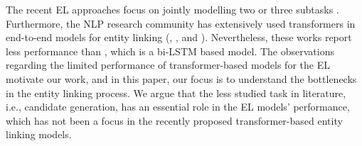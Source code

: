 \documentclass[11pt,a4paper]{article}
\begin{document}
The recent EL approaches focus on jointly modelling two or three subtasks \cite{sevgili2020neural}. Furthermore, the NLP research community has extensively used transformers in end-to-end models for entity linking (\citealt{broscheit2019investigating}, \citealt{peters2019knowledge}, and \citealt{evry2020empirical}). Nevertheless, these works report less performance than \cite{kolitsas2018end}, which is a bi-LSTM based model. The observations regarding the limited performance of transformer-based models for the EL motivate our work, and in this paper, our focus is to understand the bottlenecks in the entity linking process. We argue that the less studied task in literature, i.e., candidate generation, has an essential role in the EL models' performance, which has not been a focus in the recently proposed transformer-based entity linking models. 
\end{document}
